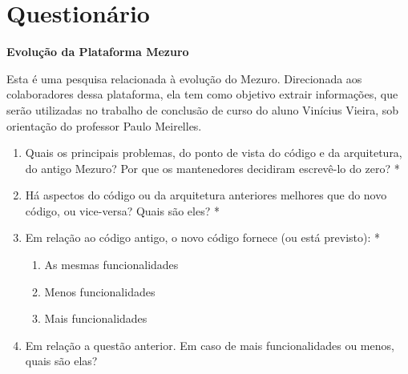 


\newpage
\appendix
\section{Questionário} 
\label{form-pesquisa}

\textbf{{\large Evolução da Plataforma Mezuro}}

\begin{mdframed}
Esta é uma pesquisa relacionada à evolução do Mezuro. Direcionada aos colaboradores dessa plataforma, ela tem como objetivo extrair informações, que serão utilizadas no trabalho de conclusão de curso do aluno Vinícius Vieira, sob orientação do professor Paulo Meirelles.
\end{mdframed}

\begin{enumerate}
\item Quais os principais problemas, do ponto de vista do código e da arquitetura, do antigo Mezuro? Por que os mantenedores decidiram escrevê-lo do zero? *
\item Há aspectos do código ou da arquitetura anteriores melhores que do novo código, ou vice-versa? Quais são eles? *
\item Em relação ao código antigo, o novo código fornece (ou está previsto): *
  \begin{enumerate}
  \item As mesmas funcionalidades
  \item Menos funcionalidades
  \item Mais funcionalidades 
  \end{enumerate}
\item Em relação a questão anterior. Em caso de mais funcionalidades ou menos, quais são elas? 
\end{enumerate}

